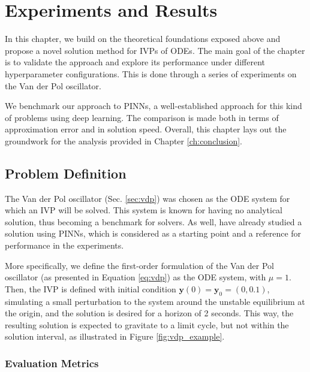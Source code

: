 \chapter{Experiments and Results}\label{ch:experiments}

In this chapter, we build on the theoretical foundations exposed above and propose a novel solution method for \glspl{IVP} of \glspl{ODE}.
The main goal of the chapter is to validate the approach and explore its performance under different hyperparameter configurations.
This is done through a series of experiments on the Van der Pol oscillator.

We benchmark our approach to \glspl{PINN}, a well-established approach for this kind of problems using deep learning.
The comparison is made both in terms of approximation error and in solution speed.
Overall, this chapter lays out the groundwork for the analysis provided in Chapter \ref{ch:conclusion}.

\section{Problem Definition}

The Van der Pol oscillator (Sec. \ref{sec:vdp}) was chosen as the \gls{ODE} system for which an \gls{IVP} will be solved.
This system is known for having no analytical solution, thus becoming a benchmark for solvers.
As well, \textcite{Antonelo2021} have already studied a solution using \gls{PINN}s, which is considered as a starting point and a reference for performance in the experiments.

More specifically, we define the first-order formulation of the Van der Pol oscillator (as presented in Equation \eqref{eq:vdp}) as the \gls{ODE} system, with $\mu=1$.
Then, the \gls{IVP} is defined with initial condition $\bm{y}(0) = \bm{y}_0 = \left( 0, 0.1 \right) $, simulating a small perturbation to the system around the unstable equilibrium at the origin, and the solution is desired for a horizon of 2 seconds. 
This way, the resulting solution is expected to gravitate to a limit cycle, but not within the solution interval, as illustrated in Figure \ref{fig:vdp_example}.

\subsection{Evaluation Metrics}

